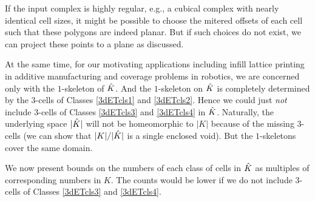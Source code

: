 \begin{rem}
{    If the input complex is highly regular, e.g., a cubical complex with nearly identical cell sizes, it might be possible to choose the mitered offsets of each cell such that these polygons are indeed planar.
    But if such choices do not exist, we can project these points to a plane as discussed. 

    At the same time, for our motivating applications including infill lattice printing in additive manufacturing and coverage problems in robotics, we are concerned only with the $1$-skeleton of $\hat{K}$.
    And the $1$-skeleton on $\hat{K}$ is completely determined by the $3$-cells of Classes \ref{3dETcls1} and \ref{3dETcls2}.
    Hence we could just \emph{not} include $3$-cells of Classes \ref{3dETcls3} and \ref{3dETcls4} in $\hat{K}$.
    Naturally, the underlying space $|\hat{K}|$ will not be homeomorphic to $|K|$ because of the missing $3$-cells (we can show that $|K|/|\hat{K}|$ is a single enclosed void).
    But the $1$-skeletons cover the same domain.
  }
\end{rem}

We now present bounds on the numbers of each class of cells in $\hat{K}$ as multiples of corresponding numbers in $K$.
The counts would be lower if we do not include $3$-cells of Classes \ref{3dETcls3} and \ref{3dETcls4}.

